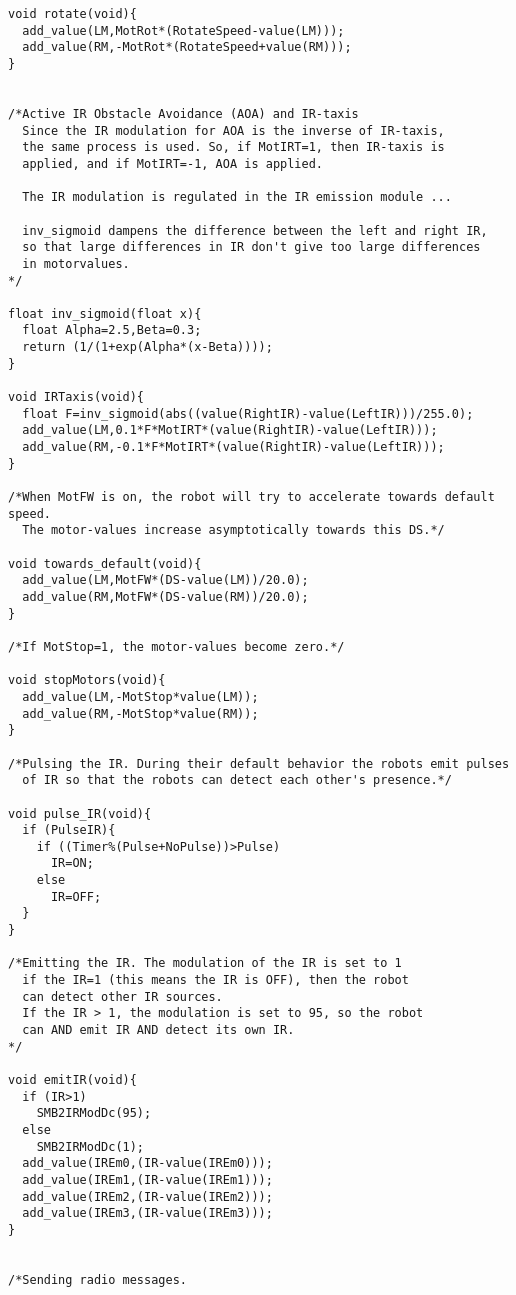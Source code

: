 \begin{lstlisting}
void rotate(void){
  add_value(LM,MotRot*(RotateSpeed-value(LM)));
  add_value(RM,-MotRot*(RotateSpeed+value(RM)));
}


/*Active IR Obstacle Avoidance (AOA) and IR-taxis
  Since the IR modulation for AOA is the inverse of IR-taxis, 
  the same process is used. So, if MotIRT=1, then IR-taxis is
  applied, and if MotIRT=-1, AOA is applied.

  The IR modulation is regulated in the IR emission module ...
    
  inv_sigmoid dampens the difference between the left and right IR, 
  so that large differences in IR don't give too large differences 
  in motorvalues.
*/

float inv_sigmoid(float x){
  float Alpha=2.5,Beta=0.3;
  return (1/(1+exp(Alpha*(x-Beta))));
}

void IRTaxis(void){
  float F=inv_sigmoid(abs((value(RightIR)-value(LeftIR)))/255.0);
  add_value(LM,0.1*F*MotIRT*(value(RightIR)-value(LeftIR)));
  add_value(RM,-0.1*F*MotIRT*(value(RightIR)-value(LeftIR)));
}

/*When MotFW is on, the robot will try to accelerate towards default speed.
  The motor-values increase asymptotically towards this DS.*/

void towards_default(void){ 	
  add_value(LM,MotFW*(DS-value(LM))/20.0);
  add_value(RM,MotFW*(DS-value(RM))/20.0);
}	

/*If MotStop=1, the motor-values become zero.*/

void stopMotors(void){	
  add_value(LM,-MotStop*value(LM));
  add_value(RM,-MotStop*value(RM));
}

/*Pulsing the IR. During their default behavior the robots emit pulses
  of IR so that the robots can detect each other's presence.*/

void pulse_IR(void){
  if (PulseIR){
    if ((Timer%(Pulse+NoPulse))>Pulse)
      IR=ON;
    else
      IR=OFF;
  }
}

/*Emitting the IR. The modulation of the IR is set to 1 
  if the IR=1 (this means the IR is OFF), then the robot 
  can detect other IR sources.
  If the IR > 1, the modulation is set to 95, so the robot 
  can AND emit IR AND detect its own IR.
*/

void emitIR(void){	
  if (IR>1)
    SMB2IRModDc(95);
  else
    SMB2IRModDc(1);
  add_value(IREm0,(IR-value(IREm0)));
  add_value(IREm1,(IR-value(IREm1)));
  add_value(IREm2,(IR-value(IREm2)));
  add_value(IREm3,(IR-value(IREm3)));
}


/*Sending radio messages.


\end{lstlisting}

